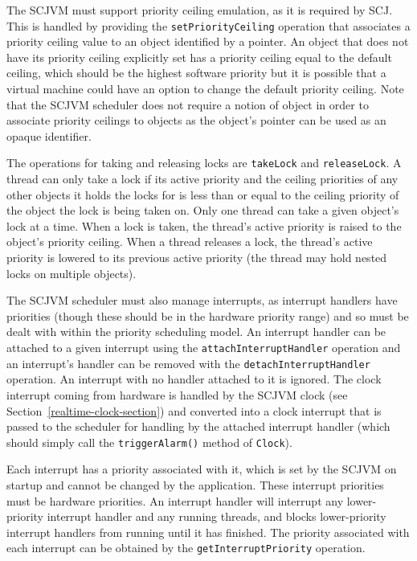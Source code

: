 \documentclass[a4paper,10pt]{report}
\begin{document}
The SCJVM must support priority ceiling emulation, as it is required
by SCJ.
This is handled by providing the \texttt{set\-Priority\-Ceiling}
operation that associates a priority ceiling value to an object
identified by a pointer.
An object that does not have its priority ceiling explicitly set has a
priority ceiling equal to the default ceiling, which should be the
highest software priority but it is possible that a virtual machine
could have an option to change the default priority ceiling.
Note that the SCJVM scheduler does not require a notion of object in
order to associate priority ceilings to objects as the object's
pointer can be used as an opaque identifier.

The operations for taking and releasing locks are \texttt{takeLock}
and \texttt{releaseLock}.
A thread can only take a lock if its active priority and the ceiling
priorities of any other objects it holds the locks for is less than or
equal to the ceiling priority of the object the lock is being taken
on.
Only one thread can take a given object's lock at a time.
When a lock is taken, the thread's active priority is raised to the
object's priority ceiling.
When a thread releases a lock, the thread's active priority is lowered
to its previous active priority (the thread may hold nested locks on
multiple objects).

The SCJVM scheduler must also manage interrupts, as interrupt handlers
have priorities (though these should be in the hardware priority
range) and so must be dealt with within the priority scheduling model.
An interrupt handler can be attached to a given interrupt using the
\texttt{attach\-Interrupt\-Handler} operation and an interrupt's
handler can be removed with the \texttt{detach\-Interrupt\-Handler}
operation.
An interrupt with no handler attached to it is ignored.
The clock interrupt coming from hardware is handled by the SCJVM clock
(see Section~\ref{realtime-clock-section}) and converted into a clock
interrupt that is passed to the scheduler for handling by the attached
interrupt handler (which should simply call the
\texttt{triggerAlarm()} method of \texttt{Clock}).

Each interrupt has a priority associated with it, which is set by the
SCJVM on startup and cannot be changed by the application.
These interrupt priorities must be hardware priorities.
An interrupt handler will interrupt any lower-priority interrupt
handler and any running threads, and blocks lower-priority interrupt
handlers from running until it has finished.
The priority associated with each interrupt can be obtained by the
\texttt{get\-Interrupt\-Priority} operation.
\end{document}
